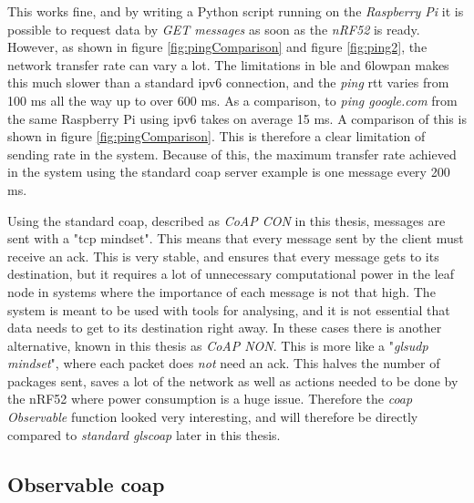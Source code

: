 
This works fine, and by writing a Python script running on the \textit{Raspberry Pi} it is possible to request data by \textit{GET messages} as soon as the \textit{nRF52} is ready. However, as shown in figure \ref{fig:pingComparison} and figure \ref{fig:ping2}, the network transfer rate can vary a lot. The limitations in \gls{ble} and \gls{6lowpan} makes this much slower than a standard \gls{ipv6} connection, and the \textit{ping} \gls{rtt} varies from 100 ms all the way up to over 600 ms. As a comparison, to \textit{ping google.com} from the same Raspberry Pi using \gls{ipv6} takes on average 15 ms. A comparison of this is shown in figure \ref{fig:pingComparison}. This is therefore a clear limitation of sending rate in the system. Because of this, the maximum transfer rate achieved in the system using the standard \gls{coap} server example is one message every 200 ms. 

Using the standard \gls{coap}, described as \textit{CoAP CON} in this thesis, messages are sent with a "\gls{tcp} mindset". This means that every message sent by the client must receive an \gls {ack}. This is very stable, and ensures that every message gets to its destination, but it requires a lot of unnecessary computational power in the leaf node in systems where the importance of each message is not that high. The system is meant to be used with tools for analysing, and it is not essential that data needs to get to its destination right away. In these cases there is another alternative, known in this thesis as \textit{CoAP NON}. This is more like a "\textit{gls{udp} mindset}", where each packet does \textit{not} need an \gls{ack}. This halves the number of packages sent, saves a lot of the network as well as actions needed to be done by the nRF52 where power consumption is a huge issue. Therefore the \textit{\gls{coap} Observable} function looked very interesting, and will therefore be directly compared to \textit{standard gls{coap}} later in this thesis.   



\subsection{Observable \gls{coap}}

